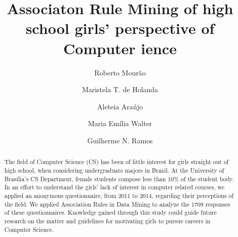 \documentclass{llncs}
\begin{document}
%
\title{Associaton Rule Mining of high school girls' perspective of Computer ience}%
%
\author{Roberto Mourão
\and Maristela T. de Holanda%
\and Aleteia Araújo%
\and Maria Emília Walter%
\and Guilherme N. Ramos}%

%

\maketitle%

\begin{abstract}%
The field of Computer Science (CS) has been of little interest for girls straight out of high school, when considering undergraduate majors in Brazil. At the University of Brasília’s CS Department, female students compose less than 10\% of the student body. In an effort to understand the girls’ lack of interest in computer related courses, we applied an anonymous questionnaire, from 2011 to 2014, regarding their perceptions of the field. We applied Association Rules in Data Mining to analyze the 1709 responses of these questionnaires. Knowledge gained through this study could guide future research on the matter and guidelines for motivating girls to pursue careers in Computer Science.


%
\end{abstract}%

%
%
%
%
%

%
%
\end{document}
